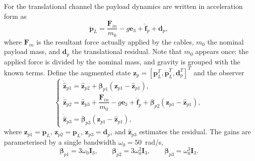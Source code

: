 \documentclass[Review,sageh,times]{sagej}
\begin{document}
For the translational channel the payload dynamics are written in
acceleration form as
\begin{equation}
\ddot{\mathbf{p}}_L = \frac{\mathbf{F}_{in}}{m_0} - g\mathbf{e}_3
+ \hat{\mathbf{f}}_p + \mathbf{d}_p,
\label{eq:posacc}
\end{equation}
where $\mathbf{F}_{in}$ is the resultant force actually applied by the cables,
$m_0$ the nominal payload mass, and $\mathbf{d}_p$ the translational residual.
Note that $m_0$ appears once: the applied force is divided by the nominal
mass, and gravity is grouped with the known terms. Define the augmented
state $\mathbf{z}_p=[\mathbf{p}_L^{T},\dot{\mathbf{p}}_L^{T},\mathbf{d}_p^{T}]^{T}$ and the
observer
\begin{equation}
\begin{cases}
\dot{\hat{\mathbf{z}}}_{p1} = \hat{\mathbf{z}}_{p2} + \boldsymbol{\beta}_{p1}\left(\mathbf{z}_{p1}-\hat{\mathbf{z}}_{p1}\right),\\[1mm]
\dot{\hat{\mathbf{z}}}_{p2} = \hat{\mathbf{z}}_{p3} + \dfrac{\mathbf{F}_{in}}{m_0} - g\mathbf{e}_3 + \hat{\mathbf{f}}_p
+ \boldsymbol{\beta}_{p2}\left(\mathbf{z}_{p1}-\hat{\mathbf{z}}_{p1}\right),\\[1mm]
\dot{\hat{\mathbf{z}}}_{p3} = \boldsymbol{\beta}_{p3}\left(\mathbf{z}_{p1}-\hat{\mathbf{z}}_{p1}\right),
\end{cases}
\label{eq:esopos}
\end{equation}
where $\mathbf{z}_{p1}=\mathbf{p}_L$, $\mathbf{z}_{p2}=\dot{\mathbf{p}}_L$,
$\mathbf{z}_{p3}=\mathbf{d}_p$, and $\hat{\mathbf{z}}_{p3}$ estimates the residual. The
gains are parameterised by a single bandwidth $\omega_0=50$~rad/s,
\begin{equation}
\boldsymbol{\beta}_{p1}=3\omega_0\mathbf{I}_3,\qquad
\boldsymbol{\beta}_{p2}=3\omega_0^{2}\mathbf{I}_3,\qquad
\boldsymbol{\beta}_{p3}=\omega_0^{3}\mathbf{I}_3 .
\label{eq:esogain}
\end{equation}
\end{document}
